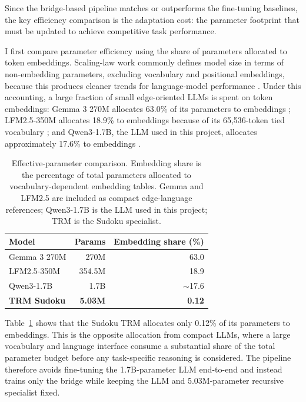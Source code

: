 \documentclass[11pt]{article}
\begin{document}
Since the bridge-based pipeline matches or outperforms the fine-tuning baselines, the key efficiency comparison is the adaptation cost: the parameter footprint that must be updated to achieve competitive task performance.

I first compare parameter efficiency using the share of parameters allocated to token embeddings.
Scaling-law work commonly defines model size in terms of non-embedding parameters, excluding vocabulary and positional embeddings, because this produces cleaner trends for language-model performance \cite{kaplanScalingLawsNeural2020}.
Under this accounting, a large fraction of small edge-oriented LLMs is spent on token embeddings: Gemma 3 270M allocates 63.0\% of its parameters to embeddings \cite{IntroducingGemma3}; LFM2.5-350M allocates 18.9\% to embeddings because of its 65,536-token tied vocabulary \cite{LFM25350MNoSize,LiquidAILFM25350MHugging2026}; and Qwen3-1.7B, the LLM used in this project, allocates approximately 17.6\% to embeddings \cite{yangQwen3TechnicalReport2025,QwenQwen317BHugging2025}.

\begin{table}[!t]
\centering
\footnotesize
\caption{Effective-parameter comparison. Embedding share is the percentage of total parameters allocated to vocabulary-dependent embedding tables. Gemma and LFM2.5 are included as compact edge-language references; Qwen3-1.7B is the LLM used in this project; TRM is the Sudoku specialist.}
\label{tab:effective_parameter_accounting}
\begin{tabular}{@{}lrr@{}}
\toprule
Model & Params & Embedding share (\%) \\
\midrule
Gemma 3 270M & 270M & 63.0 \\
LFM2.5-350M & 354.5M & 18.9 \\
Qwen3-1.7B & 1.7B & $\sim$17.6 \\
\textbf{TRM Sudoku} & \textbf{5.03M} & \textbf{0.12} \\
\bottomrule
\end{tabular}
\end{table}

Table~\ref{tab:effective_parameter_accounting} shows that the Sudoku TRM allocates only 0.12\% of its parameters to embeddings.
This is the opposite allocation from compact LLMs, where a large vocabulary and language interface consume a substantial share of the total parameter budget before any task-specific reasoning is considered.
The pipeline therefore avoids fine-tuning the 1.7B-parameter LLM end-to-end and instead trains only the bridge while keeping the LLM and 5.03M-parameter recursive specialist fixed.
\end{document}
